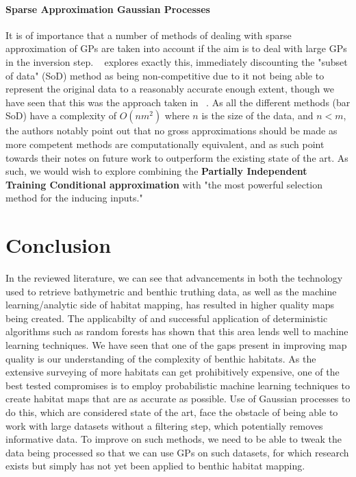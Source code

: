 \documentclass[12pt]{article}
\begin{document}
            \paragraph{Sparse Approximation Gaussian Processes}
            It is of importance that a number of methods of dealing with sparse approximation of GPs are taken into account if the aim is to deal with large GPs in the inversion step. ~\citep{candela05} explores exactly this, immediately discounting the "subset of data" (SoD) method as being non-competitive due to it not being able to represent the original data to a reasonably accurate enough extent, though we have seen that this was the approach taken in ~\citep{bender12}. As all the different methods (bar SoD) have a complexity of $O(nm^{2})$ where $n$ is the size of the data, and $n<m$, the authors notably point out that no gross approximations should be made as more competent methods are computationally equivalent, and as such point towards their notes on future work to outperform the existing state of the art. As such, we would wish to explore combining the \textbf{Partially Independent Training Conditional approximation} with "the most powerful selection method for the inducing inputs." 

            \section{Conclusion}
            In the reviewed literature, we can see that advancements in both the technology used to retrieve bathymetric and benthic truthing data, as well as the machine learning/analytic side of habitat mapping, has resulted in higher quality maps being created. The applicabilty of and successful application of deterministic algorithms such as random forests has shown that this area lends well to machine learning techniques. We have seen that one of the gaps present in improving map quality is our understanding of the complexity of benthic habitats. As the extensive surveying of more habitats can get prohibitively expensive, one of the best tested compromises is to employ probabilistic machine learning techniques to create habitat maps that are as accurate as possible. Use of Gaussian processes to do this, which are considered state of the art, face the obstacle of being able to work with large datasets without a filtering step, which potentially removes informative data. To improve on such methods, we need to be able to tweak the data being processed so that we can use GPs on such datasets, for which research exists but simply has not yet been applied to benthic habitat mapping.

\newpage




\end{document}
